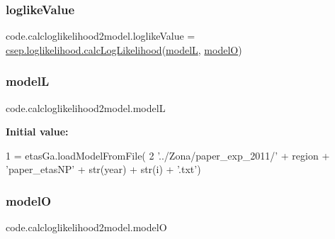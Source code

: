 \mbox{\label{namespacecode_1_1calcloglikelihood2model_a5b4c8d5b3315c97624599ed80527ae4c}} 
\subsubsection{\texorpdfstring{loglike\+Value}{loglikeValue}}
{\footnotesize\ttfamily code.\+calcloglikelihood2model.\+loglike\+Value = \hyperlink{namespacecode_1_1csep_1_1loglikelihood_a4210aa6f0234a558dc10b7d9efbce3d7}{csep.\+loglikelihood.\+calc\+Log\+Likelihood}(\hyperlink{namespacecode_1_1calcloglikelihood2model_a5aaa93097dbdcb0c7e0489a15713ba4b}{modelL}, \hyperlink{namespacecode_1_1calcloglikelihood2model_a925ea1bdbcc96295bcb651978a42ee9b}{modelO})}

\mbox{\label{namespacecode_1_1calcloglikelihood2model_a5aaa93097dbdcb0c7e0489a15713ba4b}} 
\subsubsection{\texorpdfstring{modelL}{modelL}}
{\footnotesize\ttfamily code.\+calcloglikelihood2model.\+modelL}

{\bfseries Initial value\+:}
\begin{DoxyCode}
1 =  etasGa.loadModelFromFile(
2     \textcolor{stringliteral}{'../Zona/paper\_exp\_2011/'} + region + \textcolor{stringliteral}{'paper\_etasNP'} + str(year) + str(i) + \textcolor{stringliteral}{'.txt'})
\end{DoxyCode}
\mbox{\label{namespacecode_1_1calcloglikelihood2model_a925ea1bdbcc96295bcb651978a42ee9b}} 
\subsubsection{\texorpdfstring{modelO}{modelO}}
{\footnotesize\ttfamily code.\+calcloglikelihood2model.\+modelO}

